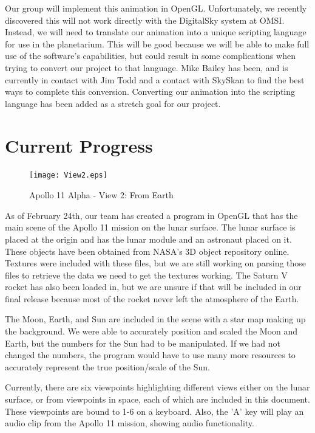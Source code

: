 \documentclass[onecolumn, draftclsnofoot,10pt, compsoc]{IEEEtran}
\begin{document}
Our group will implement this animation in OpenGL. Unfortunately, we recently discovered this will not work directly with the DigitalSky system at OMSI. Instead, we will need to translate our animation into a unique scripting language for use in the planetarium. This will be good because we will be able to make full use of the software's capabilities, but could result in some complications when trying to convert our project to that language. Mike Bailey has been, and is currently in contact with Jim Todd and a contact with SkySkan to find the best ways to complete this conversion. Converting our animation into the scripting language has been added as a stretch goal for our project.\newline\newline


\section{Current Progress}

\begin{figure}
    \texttt{[image: View2.eps]}
    \caption{Apollo 11 Alpha - View 2: From Earth}
    \label{fig:View 2}
\end{figure}

As of February 24th, our team has created a program in OpenGL that has the main scene of the Apollo 11 mission on the lunar surface. The lunar surface is placed at the origin and has the lunar module and an astronaut placed on it. These objects have been obtained from NASA's 3D object repository online. Textures were included with these files, but we are still working on parsing those files to retrieve the data we need to get the textures working. The Saturn V rocket has also been loaded in, but we are unsure if that will be included in our final release because most of the rocket never left the atmosphere of the Earth. 

The Moon, Earth, and Sun are included in the scene with a star map making up the background. We were able to accurately position and scaled the Moon and Earth, but the numbers for the Sun had to be manipulated. If we had not changed the numbers, the program would have to use many more resources to accurately represent the true position/scale of the Sun. 

Currently, there are six viewpoints highlighting different views either on the lunar surface, or from viewpoints in space, each of which are included in this document. These viewpoints are bound to 1-6 on a keyboard. Also, the 'A' key will play an audio clip from the Apollo 11 mission, showing audio functionality.  
\end{document}
